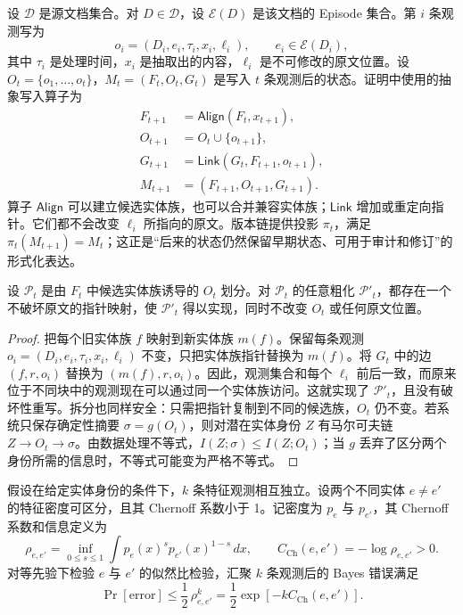 设 $\mathcal D$ 是源文档集合。对 $D\in\mathcal D$，设 $\mathcal E(D)$ 是该文档的 Episode 集合。第 $i$ 条观测写为
\[
o_i=(D_i,e_i,\tau_i,x_i,\ell_i),
\qquad e_i\in\mathcal E(D_i),
\]
其中 $\tau_i$ 是处理时间，$x_i$ 是抽取出的内容，$\ell_i$ 是不可修改的原文位置。设 $O_t=\{o_1,\ldots,o_t\}$，$M_t=(F_t,O_t,G_t)$ 是写入 $t$ 条观测后的状态。证明中使用的抽象写入算子为
\begin{equation}
\begin{aligned}
F_{t+1}&=\mathsf{Align}(F_t,x_{t+1}),\\
O_{t+1}&=O_t\cup\{o_{t+1}\},\\
G_{t+1}&=\mathsf{Link}(G_t,F_{t+1},o_{t+1}),\\
M_{t+1}&=(F_{t+1},O_{t+1},G_{t+1}).
\end{aligned}
\label{eq:app-state-transition}
\end{equation}
算子 $\mathsf{Align}$ 可以建立候选实体族，也可以合并兼容实体族；$\mathsf{Link}$ 增加或重定向指针。它们都不会改变 $\ell_i$ 所指向的原文。版本链提供投影 $\pi_t$，满足 $\pi_t(M_{t+1})=M_t$；这正是“后来的状态仍然保留早期状态、可用于审计和修订”的形式化表达。

\begin{proposition}[延迟对齐的可修订性]
\label{prop:revisability}
设 $\mathcal P_t$ 是由 $F_t$ 中候选实体族诱导的 $O_t$ 划分。对 $\mathcal P_t$ 的任意粗化 $\mathcal P'_t$，都存在一个不破坏原文的指针映射，使 $\mathcal P'_t$ 得以实现，同时不改变 $O_t$ 或任何原文位置。
\end{proposition}

\begin{proof}
把每个旧实体族 $f$ 映射到新实体族 $m(f)$。保留每条观测 $o_i=(D_i,e_i,\tau_i,x_i,\ell_i)$ 不变，只把实体族指针替换为 $m(f)$。将 $G_t$ 中的边 $(f,r,o_i)$ 替换为 $(m(f),r,o_i)$。因此，观测集合和每个 $\ell_i$ 前后一致，而原来位于不同块中的观测现在可以通过同一个实体族访问。这就实现了 $\mathcal P'_t$，且没有破坏性重写。拆分也同样安全：只需把指针复制到不同的候选族，$O_t$ 仍不变。若系统只保存确定性摘要 $\sigma=g(O_t)$，则对潜在实体身份 $Z$ 有马尔可夫链 $Z\to O_t\to\sigma$。由数据处理不等式，$I(Z;\sigma)\le I(Z;O_t)$；当 $g$ 丢弃了区分两个身份所需的信息时，不等式可能变为严格不等式。
\end{proof}

\begin{proposition}[汇聚证据下的收敛]
\label{prop:convergence}
假设在给定实体身份的条件下，$k$ 条特征观测相互独立。设两个不同实体 $e\ne e'$ 的特征密度可区分，且其 Chernoff 系数小于 1。记密度为 $p_e$ 与 $p_{e'}$，其 Chernoff 系数和信息定义为
\[
\rho_{e,e'}=\inf_{0\le s\le 1}
\int p_e(x)^s p_{e'}(x)^{1-s}\,dx,
\qquad
C_{\mathrm{Ch}}(e,e')=-\log\rho_{e,e'}>0.
\]
对等先验下检验 $e$ 与 $e'$ 的似然比检验，汇聚 $k$ 条观测后的 Bayes 错误满足 \citep{chernoff1952measure}
\begin{equation}
\Pr[\mathrm{error}]
\le \frac12\,\rho_{e,e'}^k
=\frac12\exp\!\left[-kC_{\mathrm{Ch}}(e,e')\right].
\label{eq:chernoff-bound}
\end{equation}
\end{proposition}

